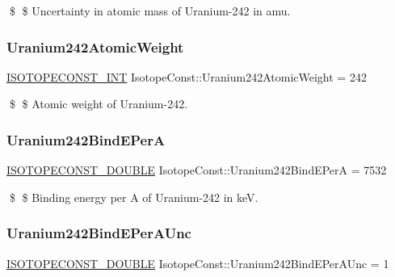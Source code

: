 \$ \$ Uncertainty in atomic mass of Uranium-\/242 in amu. \mbox{\label{group___isotope_const-_uranium-_u242_gaac49e837f4870c35339ad3b8b9017707}} 
\subsubsection{\texorpdfstring{Uranium242\+Atomic\+Weight}{Uranium242AtomicWeight}}
{\footnotesize\ttfamily \mbox{\hyperlink{group___isotope_const-_macros_ga5f18360b3e99483a35c32d789e62621c}{I\+S\+O\+T\+O\+P\+E\+C\+O\+N\+S\+T\+\_\+\+I\+NT}} Isotope\+Const\+::\+Uranium242\+Atomic\+Weight = 242}

\$ \$ Atomic weight of Uranium-\/242. \mbox{\label{group___isotope_const-_uranium-_u242_gad6afa02a78aa3206a3905001d90c1639}} 
\subsubsection{\texorpdfstring{Uranium242\+Bind\+E\+PerA}{Uranium242BindEPerA}}
{\footnotesize\ttfamily \mbox{\hyperlink{group___isotope_const-_macros_ga8f45a7272ce02c0b4c65c44636ed719a}{I\+S\+O\+T\+O\+P\+E\+C\+O\+N\+S\+T\+\_\+\+D\+O\+U\+B\+LE}} Isotope\+Const\+::\+Uranium242\+Bind\+E\+PerA = 7532}

\$ \$ Binding energy per A of Uranium-\/242 in keV. \mbox{\label{group___isotope_const-_uranium-_u242_ga0160187a0c390c4f40799d188eb45e60}} 
\subsubsection{\texorpdfstring{Uranium242\+Bind\+E\+Per\+A\+Unc}{Uranium242BindEPerAUnc}}
{\footnotesize\ttfamily \mbox{\hyperlink{group___isotope_const-_macros_ga8f45a7272ce02c0b4c65c44636ed719a}{I\+S\+O\+T\+O\+P\+E\+C\+O\+N\+S\+T\+\_\+\+D\+O\+U\+B\+LE}} Isotope\+Const\+::\+Uranium242\+Bind\+E\+Per\+A\+Unc = 1}

